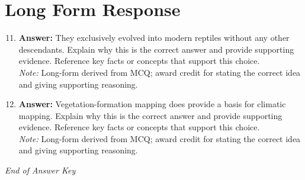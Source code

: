 \documentclass[12pt]{article}
\begin{document}
\section*{Long Form Response}
\begin{enumerate}[label=\arabic*.]
\setcounter{enumi}{10}
\item \textbf{Answer:} They exclusively evolved into modern reptiles without any other descendants. Explain why this is the correct answer and provide supporting evidence. Reference key facts or concepts that support this choice.
\\ \textit{Note:} Long-form derived from MCQ; award credit for stating the correct idea and giving supporting reasoning.
\item \textbf{Answer:} Vegetation-formation mapping does provide a basis for climatic mapping. Explain why this is the correct answer and provide supporting evidence. Reference key facts or concepts that support this choice.
\\ \textit{Note:} Long-form derived from MCQ; award credit for stating the correct idea and giving supporting reasoning.
\end{enumerate}

\vfill
\noindent\textit{End of Answer Key}
\end{document}
